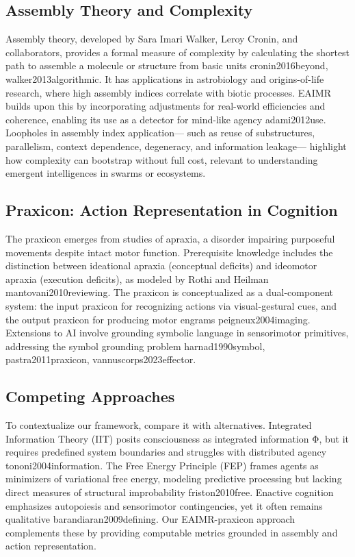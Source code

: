 \documentclass{article}
\begin{document}
\subsection{Assembly Theory and Complexity}
Assembly theory, developed by Sara Imari Walker, Leroy Cronin, and collaborators, provides a formal
measure of complexity by calculating the shortest path to assemble a molecule or structure from basic units
{cronin2016beyond, walker2013algorithmic}. It has applications in astrobiology and origins-of-life research, where high assembly indices correlate
with biotic processes. EAIMR builds upon this by incorporating adjustments for real-world efficiencies and
coherence, enabling its use as a detector for mind-like agency {adami2012use}. Loopholes in assembly index application—
such as reuse of substructures, parallelism, context dependence, degeneracy, and information leakage—
highlight how complexity can bootstrap without full cost, relevant to understanding emergent intelligences
in swarms or ecosystems.

\subsection{Praxicon: Action Representation in Cognition}
The praxicon emerges from studies of apraxia, a disorder impairing purposeful movements despite intact
motor function.
Prerequisite knowledge includes the distinction between ideational apraxia (conceptual
deficits) and ideomotor apraxia (execution deficits), as modeled by Rothi and Heilman {mantovani2010reviewing}. The praxicon is
conceptualized as a dual-component system: the input praxicon for recognizing actions via visual-gestural
cues, and the output praxicon for producing motor engrams {peigneux2004imaging}. Extensions to AI involve grounding symbolic
language in sensorimotor primitives, addressing the symbol grounding problem {harnad1990symbol, pastra2011praxicon, vannuscorps2023effector}.

\subsection{Competing Approaches}
To contextualize our framework, compare it with alternatives. Integrated Information Theory (IIT) posits
consciousness as integrated information Φ, but it requires predefined system boundaries and struggles with
distributed agency {tononi2004information}. The Free Energy Principle (FEP) frames agents as minimizers of variational free
energy, modeling predictive processing but lacking direct measures of structural improbability {friston2010free}. Enactive
cognition emphasizes autopoiesis and sensorimotor contingencies, yet it often remains qualitative {barandiaran2009defining}. Our
EAIMR-praxicon approach complements these by providing computable metrics grounded in assembly and
action representation.
\end{document}
